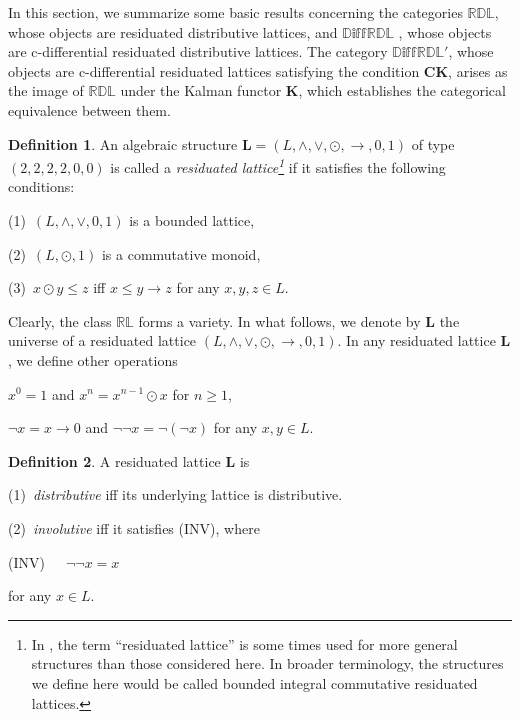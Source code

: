 \documentclass[final,12pt,times]{elsarticle}
\theoremstyle{plain}
\theoremstyle{definition}
\newtheorem{definition}{Definition}[section]
\theoremstyle{break}
\begin{document}
In this section, we summarize some basic results concerning the categories $\mathbb{RDL}$, whose objects are residuated distributive lattices, and $\mathbb{D\text{iff}RDL}$ , whose objects are c-differential residuated distributive lattices. The category $\mathbb{D\text{iff}RDL'}$, whose objects are c-differential residuated lattices satisfying the condition $\mathbf{CK}$, arises as the image of $\mathbb{RDL}$ under the Kalman functor $\mathbf{K}$, which establishes the categorical equivalence between them. 
\begin{definition}\label{definietion2.1}\cite{Galatos} An algebraic structure $\mathbf{L}=(L,\wedge,\vee,\odot,\rightarrow,0,1)$ of type $(2,2,2,2,0,0)$ is called a \emph{residuated lattice\footnote{In \cite{Galatos}, the term “residuated lattice” is some times used for more general structures than those considered here. In broader terminology, the structures we define here would be called bounded integral commutative residuated lattices.}} if it satisfies the following conditions:

  (1)\ $(L,\wedge,\vee,0,1)$ is a bounded lattice,

  (2)\ $(L,\odot,1)$ is a  commutative monoid,

  (3)\ $x\odot y\leq z$ iff $x\leq y\rightarrow z$ for any $x,y,z\in L$.
  \end{definition}

   Clearly, the class $\mathbb{RL}$ forms a variety. In what follows, we denote by $\mathbf{L}$ the universe of a residuated lattice $(L,\wedge,\vee,\odot,\rightarrow,0,1)$. In any residuated lattice $\mathbf{L}$, we define other operations
\begin{center}$x^0=1$ and $x^n=x^{n-1}\odot x$  for $n\geq 1$, 

${\neg}x=x\rightarrow 0$ and ${\neg\neg} x=\neg(\neg x)$ for any $x,y\in L$.
\end{center}

  \begin{definition}\label{definietion2.2} \cite{Galatos} A residuated lattice $\mathbf{L}$ is

  (1)\ \emph{distributive} iff its underlying lattice is distributive.

  (2)\ \emph{involutive} iff it satisfies (INV), where
  \begin{center} (INV)~~~$\neg\neg x=x$ 
  \end{center} for any $x\in L$.
  
  \end{definition}
  
\end{document}
